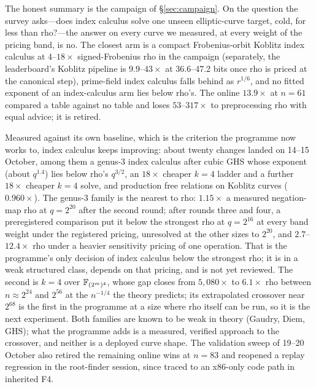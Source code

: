 The honest summary is the campaign of \S\ref{sec:campaign}. On the
question the survey asks---does index calculus solve one unseen
elliptic-curve target, cold, for less than rho?---the answer on every curve
we measured, at every weight of the pricing band, is no. The closest arm is
a compact Frobenius-orbit Koblitz index calculus at $4$--$18\times$
signed-Frobenius rho in the campaign (separately, the leaderboard's Koblitz
pipeline is $9.9$--$43\times$ at 36.6--47.2 bits once rho is priced at the
canonical step), prime-field index calculus falls behind as $r^{1/6}$,
and no fitted exponent of an index-calculus arm lies below rho's. The
online $13.9\times$ at $n=61$ compared a table against no table and loses
$53$--$317\times$ to preprocessing rho with equal advice; it is retired.

Measured against its own baseline, which is the criterion the programme now
works to, index calculus keeps improving: about twenty changes landed on
14--15 October, among them a genus-3 index calculus after cubic GHS
whose exponent (about $q^{1.4}$) lies below rho's $q^{3/2}$, an $18\times$ cheaper
$k=4$ ladder and a further $18\times$ cheaper $k=4$ solve, and production
free relations on Koblitz curves ($0.960\times$). The genus-3 family is
the nearest to rho: $1.15\times$ a measured negation-map rho at $q=2^{20}$
after the second round; after rounds three and four, a preregistered
comparison put it below the strongest rho at $q=2^{16}$ at every band weight
under the registered pricing, unresolved at the other sizes to $2^{20}$,
and $2.7$--$12.4\times$ rho under a heavier sensitivity pricing of one
operation. That is the programme's only decision of index calculus below
the strongest rho; it is in a weak structured class, depends on that
pricing, and is not yet reviewed. The second is $k=4$ over
$\mathbb{F}_{(2^m)^4}$, whose gap closes from $5{,}080\times$ to $6.1\times$ rho
between $n\approx2^{24}$ and $2^{56}$ at the $n^{-1/4}$ the theory
predicts; its extrapolated crossover near $2^{68}$ is the first in the
programme at a size where rho itself can be run, so it is the next
experiment. Both families are known to be weak in theory (Gaudry, Diem,
GHS); what the programme adds is a measured, verified approach to the
crossover, and neither is a deployed curve shape. The validation sweep of
19--20 October also retired the remaining online wins at $n=83$ and
reopened a replay regression in the root-finder session, since traced to an
x86-only code path in inherited F4.

